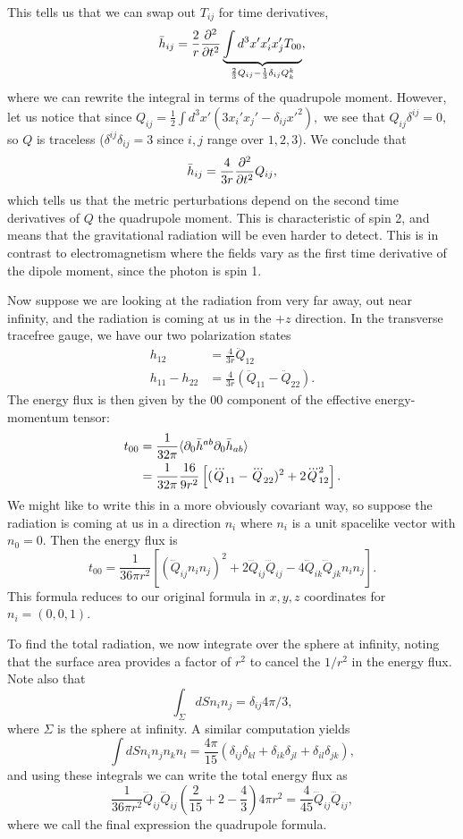 This tells us that we can swap out $T_{ij}$ for time derivatives,
$$\bar h_{ij}=\frac{2}{r} \frac{\partial^2}{\partial t^2}\underbrace{\int d^3x' x_i' x_j' T_{00}}_{\frac{2}{3}Q_{ij}-\frac{1}{3}\delta_{ij} Q^k_k},$$
where we can rewrite the integral in terms of the quadrupole moment. However, let us notice that since $Q_{ij}=\frac{1}{2}\int d^3 x'(3x_i' x_j' -\delta_{ij} x'^2),$ we see that $Q_{ij}\delta^{ij}=0,$ so $Q$ is traceless ($\delta^{ij}\delta_{ij}=3$ since $i,j$ range over $1,2,3$). We conclude that
$$\bar h_{ij}=\frac{4}{3r}\frac{\partial^2}{\partial t^2} Q_{ij},$$
which tells us that the metric perturbations depend on the second time derivatives of $Q$ the quadrupole moment. This is characteristic of spin 2, and means that the gravitational radiation will be even harder to detect. This is in contrast to electromagnetism where the fields vary as the first time derivative of the dipole moment, since the photon is spin 1.

Now suppose we are looking at the radiation from very far away, out near infinity, and the radiation is coming at us in the $+z$ direction. In the transverse tracefree gauge, we have our two polarization states
\begin{align*}
    h_{12}&=\frac{4}{3r}\ddot Q_{12}\\
    h_{11}-h_{22}&=\frac{4}{3r}(\ddot Q_{11}-\ddot Q_{22}).
\end{align*}
The energy flux is then given by the $00$ component of the effective energy-momentum tensor:
\begin{align*}
    t_{00}&=\frac{1}{32\pi}\langle\partial_0 \bar h^{ab} \partial_0 \bar h_{ab}\rangle\\
    &=\frac{1}{32\pi}\frac{16}{9r^2}\left[(\dddot Q_{11}-\dddot Q_{22})^2+2\dddot Q_{12}^2\right].
\end{align*}
We might like to write this in a more obviously covariant way, so suppose the radiation is coming at us in a direction $n_i$ where $n_i$ is a unit spacelike vector with $n_0=0$. Then the energy flux is
$$t_{00}=\frac{1}{36 \pi r^2}\left[(\dddot Q_{ij} n_i n_j)^2+2 \dddot Q_{ij} \dddot Q_{ij} -4\dddot Q_{ik} \dddot Q_{jk} n_i n_j\right].$$
This formula reduces to our original formula in $x,y,z$ coordinates for $n_i=(0,0,1)$.

To find the total radiation, we now integrate over the sphere at infinity, noting that the surface area provides a factor of $r^2$ to cancel the $1/r^2$ in the energy flux. Note also that $$\int_\Sigma dS n_i n_j = \delta_{ij}4\pi/3,$$ where $\Sigma$ is the sphere at infinity. A similar computation yields
$$\int dS n_i n_j n_k n_l = \frac{4\pi}{15}(\delta_{ij}\delta_{kl}+\delta_{ik} \delta_{jl}+\delta_{il}\delta_{jk}),$$
and using these integrals we can write the total energy flux as
$$\frac{1}{36\pi r^2}\dddot Q_{ij} \dddot Q_{ij}\left(\frac{2}{15}+2-\frac{4}{3}\right)4\pi r^2 =\frac{4}{45}\dddot Q_{ij}\dddot Q_{ij},$$
where we call the final expression the quadrupole formula. 

